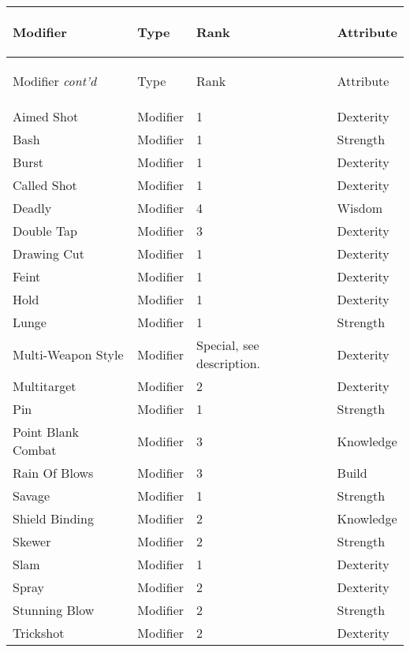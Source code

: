 \documentclass[twoside]{book}
\begin{document}
\begin{longtable}{p{1.25in}lll} 
  Modifier& \begin{turn}{70}{Type}\end{turn}
          & \begin{turn}{70}{Rank}\end{turn}
          & \begin{turn}{70}{Attribute}\end{turn}
          \\
  \hline
  \hline
  \endfirsthead
  Modifier \textit{cont'd}
        & \begin{turn}{70}{Type}\end{turn}
          & \begin{turn}{70}{Rank}\end{turn}
          & \begin{turn}{70}{Attribute}\end{turn}
           \\
  \hline
  \endhead
\raggedright Aimed Shot&Modifier&1&Dexterity\tabularnewline
      \raggedright Bash&Modifier&1&Strength\tabularnewline
      \raggedright Burst&Modifier&1&Dexterity\tabularnewline
      \raggedright Called Shot&Modifier&1&Dexterity\tabularnewline
      \raggedright Deadly&Modifier&4&Wisdom\tabularnewline
      \raggedright Double Tap&Modifier&3&Dexterity\tabularnewline
      \raggedright Drawing Cut&Modifier&1&Dexterity\tabularnewline
      \raggedright Feint&Modifier&1&Dexterity\tabularnewline
      \raggedright Hold&Modifier&1&Dexterity\tabularnewline
      \raggedright Lunge&Modifier&1&Strength\tabularnewline
      \raggedright Multi-Weapon Style&Modifier&Special, see description.&Dexterity\tabularnewline
      \raggedright Multitarget&Modifier&2&Dexterity\tabularnewline
      \raggedright Pin&Modifier&1&Strength\tabularnewline
      \raggedright Point Blank Combat&Modifier&3&Knowledge\tabularnewline
      \raggedright Rain Of Blows&Modifier&3&Build\tabularnewline
      \raggedright Savage&Modifier&1&Strength\tabularnewline
      \raggedright Shield Binding&Modifier&2&Knowledge\tabularnewline
      \raggedright Skewer&Modifier&2&Strength\tabularnewline
      \raggedright Slam&Modifier&1&Dexterity\tabularnewline
      \raggedright Spray&Modifier&2&Dexterity\tabularnewline
      \raggedright Stunning Blow&Modifier&2&Strength\tabularnewline
      \raggedright Trickshot&Modifier&2&Dexterity\tabularnewline
      
\end{longtable}
    
\end{document}
